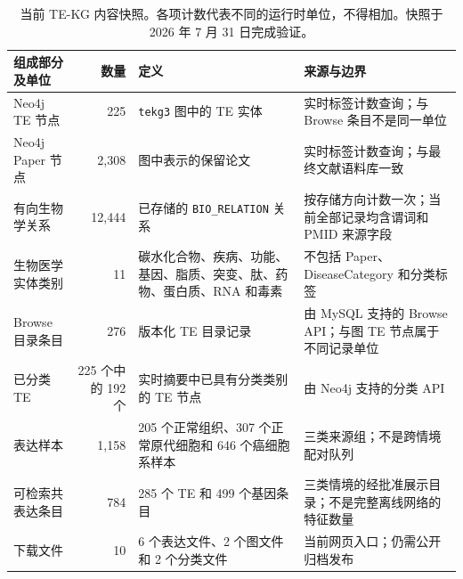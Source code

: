 \begin{table}[htbp]
\centering
\small
\caption{当前 TE-KG 内容快照。各项计数代表不同的运行时单位，不得相加。快照于 2026 年 7 月 31 日完成验证。\label{tab:snapshot-zh}}
\begin{tabularx}{\textwidth}{@{}p{} r Y Y@{}}
\toprule
组成部分及单位 & 数量 & 定义 & 来源与边界 \\
\midrule
Neo4j TE 节点 & 225 & \texttt{tekg3} 图中的 TE 实体 & 实时标签计数查询；与 Browse 条目不是同一单位 \\
Neo4j Paper 节点 & 2,308 & 图中表示的保留论文 & 实时标签计数查询；与最终文献语料库一致 \\
有向生物学关系 & 12,444 & 已存储的 \texttt{BIO\_RELATION} 关系 & 按存储方向计数一次；当前全部记录均含谓词和 PMID 来源字段 \\
生物医学实体类别 & 11 & 碳水化合物、疾病、功能、基因、脂质、突变、肽、药物、蛋白质、RNA 和毒素 & 不包括 Paper、DiseaseCategory 和分类标签 \\
Browse 目录条目 & 276 & 版本化 TE 目录记录 & 由 MySQL 支持的 Browse API；与图 TE 节点属于不同记录单位 \\
已分类 TE & 225 个中的 192 个 & 实时摘要中已具有分类类别的 TE 节点 & 由 Neo4j 支持的分类 API \\
表达样本 & 1,158 & 205 个正常组织、307 个正常原代细胞和 646 个癌细胞系样本 & 三类来源组；不是跨情境配对队列 \\
可检索共表达条目 & 784 & 285 个 TE 和 499 个基因条目 & 三类情境的经批准展示目录；不是完整离线网络的特征数量 \\
下载文件 & 10 & 6 个表达文件、2 个图文件和 2 个分类文件 & 当前网页入口；仍需公开归档发布 \\
\bottomrule
\end{tabularx}
\end{table}
